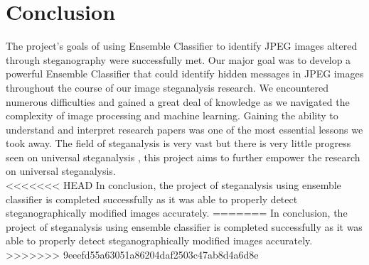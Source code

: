 \chapter{Conclusion}
The project's goals of using Ensemble Classifier to identify JPEG images altered through steganography were successfully met. Our major goal was to develop a powerful Ensemble Classifier that could identify hidden messages in JPEG images throughout the course of our image steganalysis research. We encountered numerous difficulties and gained a great deal of knowledge as we navigated the complexity of image processing and machine learning. Gaining the ability to understand and interpret research papers was one of the most essential lessons we took away. The field of steganalysis is very vast but there is very little progress seen on universal steganalysis , this project aims to further empower the research on universal steganalysis.\\
<<<<<<< HEAD
In conclusion, the project of steganalysis using ensemble classifier is completed successfully as it was able to properly detect steganographically modified images accurately.
=======
In conclusion, the project of steganalysis using ensemble classifier is completed \mbox{successfully} as it was able to properly detect steganographically modified images accurately.
>>>>>>> 9eeefd55a63051a86204daf2503c47ab8d4a6d8e

\clearpage


